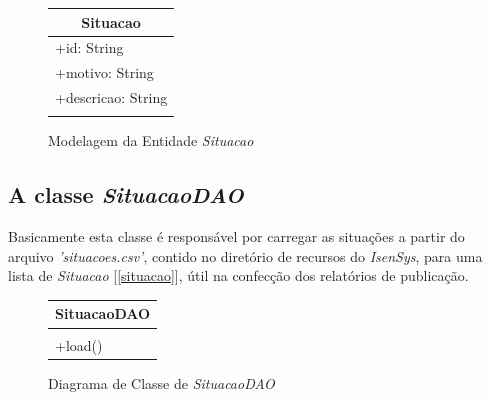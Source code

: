 \documentclass[
	12pt,			%
	openright,		%
	oneside,	
	a4paper,		%
	english,		%
	brazil			%
]{abntex2/abntex2}  %
\begin{document}
				\begin{figure}[ht]
					\begin{center}
						
						\caption{Modelagem da Entidade \textit{Situacao}}
						
						\begin{tabular}{|l|}
							\hline
							\multicolumn{1}{|c|}{\textbf{Situacao}} \\ \hline
							+id: String                             \\
							+motivo: String                         \\
							+descricao: String                      \\ \hline
							                                        \\ \hline
						\end{tabular}
						
					\end{center}
				\end{figure}
	
			\subsection{A classe \textit{SituacaoDAO}}
	
				Basicamente esta classe é responsável por carregar as situações a partir do arquivo \textit{'situacoes.csv'}, contido no diretório de recursos do \textit{IsenSys}, para uma lista de \textit{Situacao} [\ref{situacao}], útil na confecção dos relatórios de publicação.
	
				\begin{figure}[ht]
					\begin{center}
						
						\caption{Diagrama de Classe de \textit{SituacaoDAO}}
						
						\begin{tabular}{|l|}
							\hline
							\multicolumn{1}{|c|}{\textbf{SituacaoDAO}} \\ \hline
							                                           \\ \hline
							+load()                                    \\ \hline
						\end{tabular}
						
					\end{center}
				\end{figure}
	
\end{document}
